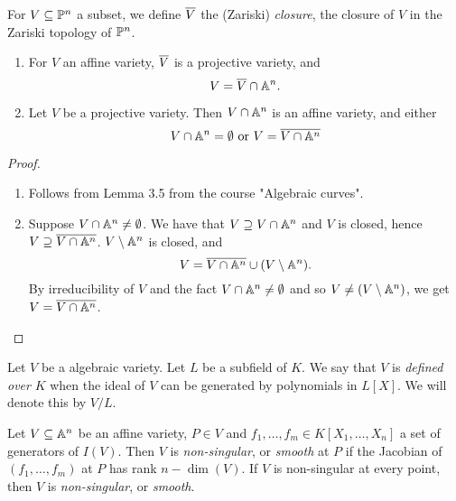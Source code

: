 \begin{definition}
	For $V \subseteq \mathbb{P}^n$ a subset, we define $\overline{V}$ the (Zariski)
	\emph{closure}, the closure of $V$ in the Zariski topology of $\mathbb{P}^n$.
\end{definition}

\begin{proposition}
	\begin{enumerate}
		\item For $V$ an affine variety, $\overline{V}$ is a projective variety, and
		\begin{equation*}
			V = \overline{V} \cap \mathbb{A}^n.
		\end{equation*}
		\item Let $V$ be a projective variety. Then $V \cap \mathbb{A}^n$ is an affine
			variety, and either
			\begin{equation*}
				V \cap \mathbb{A}^n = \emptyset
				\textrm{ or }
				V = \overline{V \cap \mathbb{A}^n}
			\end{equation*}
	\end{enumerate}
\end{proposition}

\begin{proof}
	\begin{enumerate}
		\item Follows from Lemma 3.5 from the course "Algebraic curves".
		\item Suppose $V \cap \mathbb{A}^n \neq \emptyset$. We have that
			$V \supseteq V \cap \mathbb{A}^n$ and $V$ is closed, hence
			$V \supseteq \overline{V \cap \mathbb{A}^n}$.
			$V \setminus \mathbb{A}^n$ is closed, and
			\begin{equation*}
				V = \overline{V \cap \mathbb{A}^n} \cup (V \setminus \mathbb{A}^n).
			\end{equation*}
			By irreducibility of $V$ and the fact $V \cap \mathbb{A}^n \neq \emptyset$
			and so $V \neq (V \setminus \mathbb{A}^n)$, we get $V = \overline{V \cap \mathbb{A}^n}$.
	\end{enumerate}
\end{proof}

\begin{definition}
	Let $V$ be a algebraic variety. Let $L$ be a subfield of $K$.
	We say that $V$ is \emph{defined over} $K$ when the ideal of
	$V$ can be generated by polynomials in $L[X]$.
	We will denote this by $V/L$.
\end{definition}


\begin{definition}
	Let $V \subseteq \mathbb{A}^n$ be an affine variety, $P \in V$ and 
	$f_1, \dots, f_m \in K[X_1, \dots, X_n]$ a set of generators of $I(V)$.
	Then $V$ is \emph{non-singular}, or \emph{smooth} at $P$ if the Jacobian
	of $(f_1, \dots, f_m)$ at $P$ has rank $n - \dim(V)$.
	If $V$ is non-singular at every point, then $V$ is \emph{non-singular},
	or \emph{smooth}.
\end{definition}


